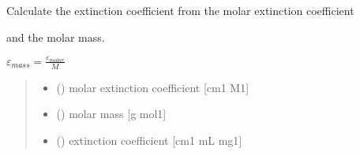 \documentclass[letterpaper,10pt,english]{sphinxmanual}
\begin{document}

\begin{fulllineitems}
\label{\detokenize{03_absorption_coefficient:skinoptics.absorption_coefficient.ext_from_molarext}}
\pysigstartsignatures
{}
\pysigstopsignatures
\begin{DUlineblock}{0em}
\item[] Calculate the extinction coefficient from the molar extinction coefficient
\item[] and the molar mass.
\end{DUlineblock}

\sphinxAtStartPar
\(\varepsilon_{mass} = \frac{\varepsilon_{molar}}{M}\)
\begin{quote}\begin{description}
\begin{itemize}
\item {} 
\sphinxAtStartPar
{} () \textendash{} molar extinction coefficient {[}cm\sphinxhyphen{}1 M\sphinxhyphen{}1{]}

\item {} 
\sphinxAtStartPar
{} () \textendash{} molar mass {[}g mol\sphinxhyphen{}1{]}

\end{itemize}

\sphinxAtStartPar
\begin{itemize}
\item {} 
\sphinxAtStartPar
{} () \textendash{} extinction coefficient {[}cm\sphinxhyphen{}1 mL mg\sphinxhyphen{}1{]}

\end{itemize}


\end{description}\end{quote}

\end{fulllineitems}
\end{document}
